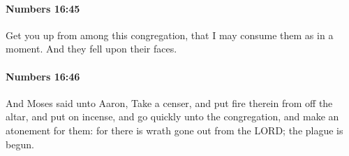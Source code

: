		\paragraph{Numbers 16:45} %
			\label{NUMBERS-16-45}

			Get you up from among this congregation, that I may consume them as in a moment. And they fell upon their faces.


		\paragraph{Numbers 16:46} %
			\label{NUMBERS-16-46}

			And Moses said unto Aaron, Take a censer, and put fire therein from off the altar, and put on incense, and go quickly unto the congregation, and make an atonement for them: for there is wrath gone out from the LORD; the plague is begun.


